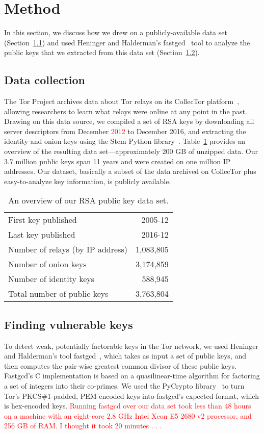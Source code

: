 \section{Method}
\label{sec:method}
In this section, we discuss how we drew on a publicly-available data set
(Section~\ref{sec:data-collection}) and used Heninger and Halderman's
fastgcd~\cite{fastgcd} tool to analyze the public keys that we extracted from
this data set (Section~\ref{sec:vulnerable-keys}).

\subsection{Data collection}
\label{sec:data-collection}
The Tor Project archives data about Tor relays on its CollecTor
platform~\cite{collector}, allowing researchers to learn what relays were online
at any point in the past.  Drawing on this data source, we compiled a set of RSA
keys by downloading all server descriptors from December \textcolor{red}{2012} to December 2016,
and extracting the identity and onion keys using the Stem Python
library~\cite{stem}.  Table~\ref{tab:dataset} provides an overview of the
resulting data set---approximately 200 GB of unzipped data.  Our 3.7 million
public keys span 11 years and were created on one million IP addresses.
Our dataset, basically a subset of the data archived on CollecTor plus
easy-to-analyze key information, is publicly available.

\begin{table}[t]
	\centering
	\begin{tabular}{l r}
	\toprule
	First key published & 2005-12 \\
	Last key published & 2016-12 \\
	Number of relays (by IP address) & 1,083,805 \\
	\midrule
	Number of onion keys & 3,174,859 \\
	Number of identity keys & 588,945 \\
	\midrule
	Total number of public keys & 3,763,804 \\
	\bottomrule
	\end{tabular}
	\caption{An overview of our RSA public key data set.}
	\label{tab:dataset}
\end{table}

\subsection{Finding vulnerable keys}
\label{sec:vulnerable-keys}
To detect weak, potentially factorable keys in the Tor network, we used Heninger
and Halderman's tool fastgcd~\cite{fastgcd}, which takes as input a set of
public keys, and then computes the pair-wise greatest common divisor of these
public keys.  Fastgcd's C implementation is based on a quasilinear-time
algorithm for factoring a set of integers into their co-primes.  We used the
PyCrypto library~\cite{pycrypto} to turn Tor's PKCS\#1-padded, PEM-encoded keys
into fastgcd's expected format, which is hex-encoded keys.  \textcolor{red}{Running 
fastgcd over
our data set took less than 48 hours on a machine with an eight-core 2.8 GHz
Intel Xeon E5 2680 v2 processor, and 256 GB of RAM. I thought it took 20 minutes . . .}

